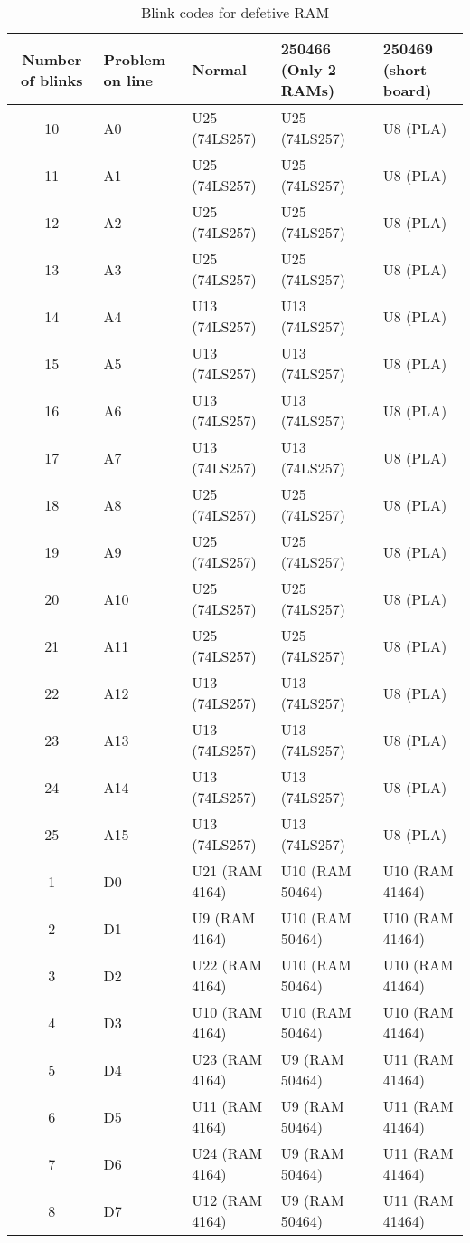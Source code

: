 \documentclass[11pt]{article} %
\begin{document}
\begin{table}[h!]
  \begin{center}
    \caption{Blink codes for defetive RAM}
    \label{tab:table1}
    \begin{tabular}{c|l|l|l|l}
      \textbf{Number of blinks} & \textbf{Problem on line} & \textbf{Normal} & \textbf{250466 (Only 2 RAMs)} & \textbf{250469 (short board)}\\
      \hline
      10 & A0 & U25 (74LS257) & U25 (74LS257) & U8 (PLA)\\
      11 & A1 & U25 (74LS257) & U25 (74LS257) & U8 (PLA)\\
      12 & A2 & U25 (74LS257) & U25 (74LS257) & U8 (PLA)\\
      13 & A3 & U25 (74LS257) & U25 (74LS257) & U8 (PLA)\\
      14 & A4 & U13 (74LS257) & U13 (74LS257) & U8 (PLA)\\
      15 & A5 & U13 (74LS257) & U13 (74LS257) & U8 (PLA)\\
      16 & A6 & U13 (74LS257) & U13 (74LS257) & U8 (PLA)\\
      17 & A7 & U13 (74LS257) & U13 (74LS257) & U8 (PLA)\\
      18 & A8 & U25 (74LS257) & U25 (74LS257) & U8 (PLA)\\
      19 & A9 & U25 (74LS257) & U25 (74LS257) & U8 (PLA)\\
      20 & A10 & U25 (74LS257) & U25 (74LS257) & U8 (PLA)\\
      21 & A11 & U25 (74LS257) & U25 (74LS257) & U8 (PLA)\\
      22 & A12 & U13 (74LS257) & U13 (74LS257) & U8 (PLA)\\
      23 & A13 & U13 (74LS257) & U13 (74LS257) & U8 (PLA)\\
      24 & A14 & U13 (74LS257) & U13 (74LS257) & U8 (PLA)\\
      25 & A15 & U13 (74LS257) & U13 (74LS257) & U8 (PLA)\\
      1 & D0 & U21 (RAM 4164) & U10 (RAM 50464) & U10 (RAM 41464)\\
      2 & D1 & U9 (RAM 4164) & U10 (RAM 50464) & U10 (RAM 41464) \\
      3 & D2 & U22 (RAM 4164) & U10 (RAM 50464) & U10 (RAM 41464) \\
      4 & D3 & U10 (RAM 4164) & U10 (RAM 50464) & U10 (RAM 41464) \\
      5 & D4 & U23 (RAM 4164) & U9 (RAM 50464) & U11 (RAM 41464) \\
      6 & D5 & U11 (RAM 4164) & U9 (RAM 50464) & U11 (RAM 41464) \\
      7 & D6 & U24 (RAM 4164) & U9 (RAM 50464) & U11 (RAM 41464) \\
      8 & D7 & U12 (RAM 4164) & U9 (RAM 50464) & U11 (RAM 41464) \\
    \end{tabular}
  \end{center}
\end{table}
\end{document}
